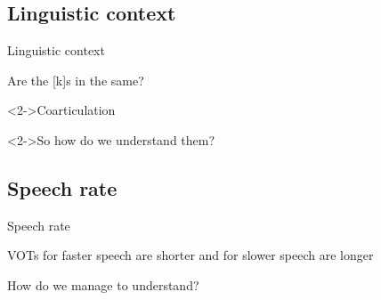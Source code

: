 \documentclass{beamer}
\newcommand{\subonefour}{Linguistic context}
\newcommand{\subonefive}{Speech rate}
\begin{document}
    \subsection{\subonefour}
      \begin{frame}{\subonefour}
        \begin{block}{Are the [k]s in  the same?}
        \end{block}
        \begin{alertblock}<2->{Coarticulation}
          
        \end{alertblock}
        \begin{block}<2->{So how do we understand them?}
        \end{block}
      \end{frame}

    \subsection{\subonefive}
      \begin{frame}{\subonefive}
        \begin{block}{}
          VOTs for faster speech are shorter and for slower speech are longer
        \end{block}
        \begin{block}{How do we manage to understand?}
        \end{block}
      \end{frame}
\end{document}
